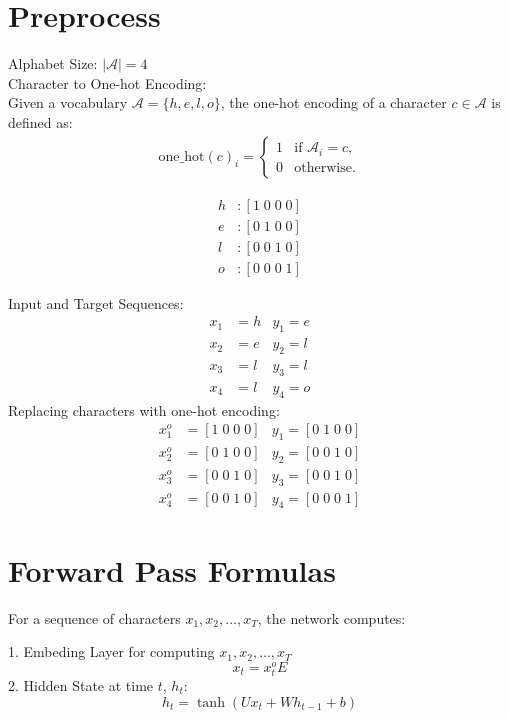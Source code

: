 \documentclass{article}
\begin{document}
\section{Preprocess}
Alphabet Size: $|\mathcal{A}| = 4$  \\
Character to One-hot Encoding: \\
Given a vocabulary $\mathcal{A} = \{h, e, l, o\}$, the one-hot encoding of a character $c \in \mathcal{A}$ is defined as:
\begin{align*}
\text{one\_hot}(c)_i = 
\begin{cases} 
1 & \text{if } \mathcal{A}_i = c, \\
0 & \text{otherwise}.
\end{cases}
\end{align*}

\begin{align*}
    h & : [1\; 0\; 0\; 0] \\
    e & : [0\; 1\; 0\; 0] \\
    l & : [0\; 0\; 1\; 0] \\
    o & : [0\; 0\; 0\; 1]
\end{align*}

Input and Target Sequences:
\begin{align*}
    x_1 & = h  &y_1 = e \\
    x_2 & = e  &y_2 = l \\
    x_3& = l  &y_3 = l \\
    x_4 & = l  &y_4 = o
\end{align*}
Replacing characters with one-hot encoding:
\begin{align*}
    x^o_1 & = [1\; 0\; 0\; 0]  &y_1 = [0\; 1\; 0\; 0] \\
    x^o_2 & = [0\; 1\; 0\; 0]  &y_2 = [0\; 0\; 1\; 0] \\
    x^o_3& = [0\; 0\; 1\; 0]  &y_3 = [0\; 0\; 1\; 0] \\
    x^o_4 & = [0\; 0\; 1\; 0]  &y_4 = [0\; 0\; 0\; 1]
\end{align*}

\section{Forward Pass Formulas}

For a sequence of characters $x_1, x_2, \ldots, x_T$, the network computes:

1. Embeding Layer for computing $x_1, x_2, \ldots, x_T$ \\
$$
x_t = x^o_t E
$$
2. Hidden State at time $t$, $h_t$:
$$
h_t = \tanh(Ux_t + Wh_{t-1} + b)
$$
\end{document}
